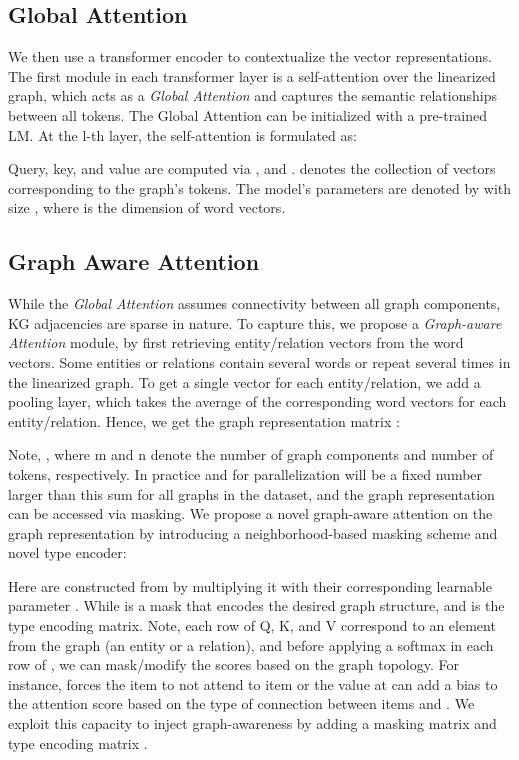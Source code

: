 \documentclass[11pt]{article}
\begin{document}
\subsection{Global Attention}
We then use a transformer encoder to contextualize the vector representations. The first module in each transformer layer is a self-attention over the linearized graph, which acts as a \textit{Global Attention} and captures the semantic relationships between all tokens. The Global Attention can be initialized with a pre-trained LM. At the l-th layer, the self-attention is formulated as:

Query, key, and value are computed via , and .  denotes the collection of vectors corresponding to the graph's tokens. The model's parameters are denoted by  with size , where  is the dimension of word vectors. 

\subsection{Graph Aware Attention}
While the \textit{Global Attention} assumes connectivity between all graph components, KG adjacencies are sparse in nature. To capture this, we propose a \textit{Graph-aware Attention} module, by first retrieving entity/relation vectors from the word vectors. Some entities or relations contain several words or repeat several times in the linearized graph. To get a single vector for each entity/relation, we add a pooling layer, which takes the average of the corresponding word vectors for each entity/relation. Hence, we get the graph representation matrix :


Note, , where m and n denote the number of graph components and number of tokens, respectively. In practice and for parallelization  will be a fixed number larger than this sum for all graphs in the dataset, and the graph representation can be accessed via masking. We propose a novel graph-aware attention on the graph representation  by introducing a neighborhood-based masking scheme and novel type encoder:



Here  are constructed from  by multiplying it with their corresponding learnable parameter . While  is a mask that encodes the desired graph structure, and  is the type encoding matrix. 
Note, each row of Q, K, and V correspond to an element from the graph (an entity or a relation), and before applying a softmax in each row of , we can mask/modify the scores based on the graph topology. 
For instance,  forces the item  to not attend to item  or the value at  can add a bias to the attention score based on the type of connection between items  and . We exploit this capacity to inject graph-awareness by adding a masking matrix  and type encoding matrix .
\end{document}
